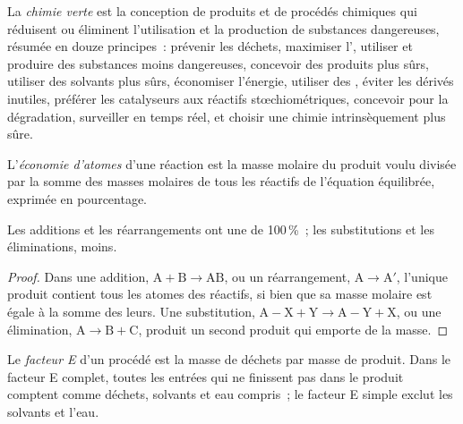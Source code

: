 \begin{definition}\label{def:b3:green-industrial:green-chemistry}
La \emph{chimie verte} est la conception de produits et
de procédés chimiques qui réduisent ou éliminent l'utilisation et la
production de substances dangereuses, résumée en douze principes~:
prévenir les déchets, maximiser l', utiliser et produire
des substances moins dangereuses, concevoir des produits plus sûrs,
utiliser des solvants plus sûrs, économiser l'énergie, utiliser des
, éviter les dérivés inutiles, préférer les
catalyseurs aux réactifs stœchiométriques, concevoir pour la dégradation,
surveiller en temps réel, et choisir une chimie intrinsèquement plus sûre.
\end{definition}

\begin{definition}\label{def:b3:green-industrial:atom-economy}
L'\emph{économie d'atomes} d'une réaction est la masse molaire
du produit voulu divisée par la somme des masses molaires de tous les
réactifs de l'équation équilibrée, exprimée en pourcentage.
\end{definition}

\begin{proposition}\label{prop:b3:green-industrial:ae-classes}
Les additions et les réarrangements ont une  de 100\,\%~;
les substitutions et les éliminations, moins.
\end{proposition}

\begin{proof}
Dans une addition, $\mathrm{A} + \mathrm{B} \to \mathrm{AB}$, ou un réarrangement, $\mathrm{A} \to \mathrm{A'}$, l'unique produit contient tous les
atomes des réactifs, si bien que sa masse molaire est égale à la somme des
leurs. Une substitution, $\mathrm{A{-}X} + \mathrm{Y} \to \mathrm{A{-}Y} + \mathrm{X}$, ou une élimination, $\mathrm{A} \to \mathrm{B} + \mathrm{C}$, produit un
second produit qui emporte de la masse.
\end{proof}

\begin{definition}[Facteur E]\label{def:b3:green-industrial:e-factor}
Le \emph{facteur E} d'un procédé est la masse de déchets par
masse de produit. Dans le facteur E complet, toutes les entrées qui ne
finissent pas dans le produit comptent comme déchets, solvants et eau
compris~; le facteur E simple exclut les solvants et l'eau.
\end{definition}


